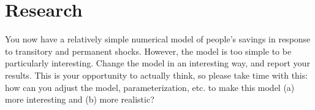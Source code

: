\documentclass[11pt]{article}
\begin{document}
\clearpage
\section{Research}
You now have a relatively simple numerical model of people's savings in response to transitory and permanent shocks.  However, the model is too simple to be particularly interesting.  Change the model in an interesting way, and report your results.  This is your opportunity to actually think, so please take time with this:  how can you adjust the model, parameterization, etc. to make this model (a) more interesting and (b) more realistic?
\end{document}
